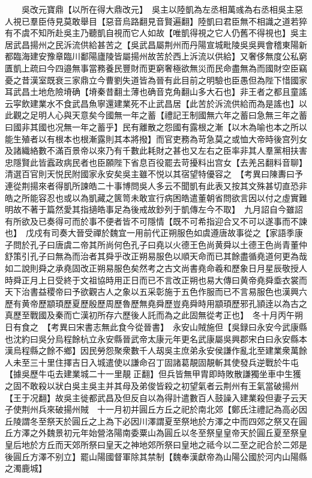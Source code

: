 　　吳改元寶鼎【以所在得大鼎改元】　吳主以陸凱為左丞相萬彧為右丞相吳主惡人視已羣臣侍見莫敢舉目【惡音烏路翻見音賢遍翻】陸凱曰君臣無不相識之道若猝有不虞不知所赴吳主乃聽凱自視而它人如故【唯凱得視之它人仍舊不得視也】吳主居武昌揚州之民泝流供給甚苦之【吳武昌屬荆州而丹陽宣城毗陵吳吳興會稽東陽新都臨海建安豫章臨川鄱陽廬陵皆屬揚州故苦於西上泝流以供給】又奢侈無度公私窮匱凱上疏曰今四邉無事當務養民豐財而更窮奢極欲無災而民命盡無為而國財空臣竊憂之昔漢室既衰三家鼎立今曹劉失道皆為晉有此目前之明驗也臣愚但為陛下惜國家耳武昌土地危險塉确【塉秦昔翻土薄也确音克角翻山多大石也】非王者之都且童謠云寜飲建業水不食武昌魚寧還建業死不止武昌居【此苦於泝流供給而為是謠也】以此觀之足明人心與天意矣今國無一年之蓄【禮記王制國無六年之蓄曰急無三年之蓄曰國非其國也况無一年之蓄乎】民有離散之怨國有露根之漸【以木為喻也本之所以能生殖者以有根本也根漸露則其本將撥】而官吏務為苛急莫之或恤大帝時後宫列女及諸織絡數不滿百景帝以來乃有千數此耗財之甚也又左右之臣率非其人羣黨相扶害忠隱賢此皆蠧政病民者也臣願陛下省息百役罷去苛擾料出宫女【去羌呂翻料音聊】清選百官則天悦民附國家永安矣吳主雖不悦以其宿望特優容之　【考異曰陳夀曰予連從荆揚來者得凱所諫皓二十事博問吳人多云不聞凱有此表又按其文殊甚切直恐非皓之所能容忍也或以為凱藏之篋笥未敢宣行病困皓遣董朝省問欲言因以付之虛實難明故不著于篇然愛其指擿皓事足為後戒故鈔列于凱傳左今不取】　九月詔自今雖詔有所欲及已奏得可而於事不便者皆不可隱情【既不可希指迎合又不可以遂事而不諫也】　戊戍有司奏大晉受禪於魏宜一用前代正朔服色如虞遵唐故事從之【家語季康子問於孔子曰唐虞二帝其所尚何色孔子曰堯以火德王色尚黄舜以土德王色尚青董仲舒策引孔子曰無為而治者其舜乎改正朔易服色以順天命而已其餘盡循堯道何更為哉如二說則舜之承堯固改正朔易服色矣然考之古文尚書堯命羲和歷象日月星辰敬授人時舜正月上日受終于文祖協時用正日而已不言改正朔也易大傳曰黄帝堯舜埀衣裳而天下治書益稷帝曰予欲觀古人之象以五采彰施于五色作服而已不言易服色也漢興六歷有黄帝歷顓頊歷夏歷殷歷周歷魯歷無堯舜歷豈堯舜時用顓頊歷邪孔頴逹以為古之真歷至戰國及秦而亡漢初所存六歷後人託而為之此固無從考正也】　冬十月丙午朔日有食之　【考異曰宋書志無此食今從晉書】　永安山賊施但【吳録曰永安今武康縣也沈約曰吳分烏程餘杭立永安縣晉武帝太康元年更名武康屬吳興郡宋白曰永安縣本漢烏程縣之餘不鄉】因民勞怨聚衆數千人刼吳主庶弟永安侯謙作亂北至建業衆萬餘人未至三十里住擇吉日入城遣使以謙命召丁固諸葛靚固靚斬其使發兵逆戰於牛屯【據吳歷牛屯去建業城二十一里靚正翻】但兵皆無甲胄即時敗散謙獨坐車中生獲之固不敢殺以狀白吳主吳主并其母及弟俊皆殺之初望氣者云荆州有王氣當破揚州【王于况翻】故吳主徙都武昌及但反自以為得計遣數百人鼓譟入建業殺但妻子云天子使荆州兵來破揚州賊　十一月初并圓丘方丘之祀於南北郊【鄭氏注禮記為高必因丘陵謂冬至祭天於圓丘之上為下必因川澤謂夏至祭地於方澤之中而四郊之祭又在圓丘方澤之外魏景初元年始營洛陽南委粟山為圓丘以冬至祭皇皇帝天於圓丘夏至祭皇皇后地於方丘而天郊所祭曰皇天之神地郊所祭曰皇地之祗今以二至之祀合於二郊是後圓丘方澤不别立】罷山陽國督軍除其禁制【魏奉漢獻帝為山陽公國於河内山陽縣之濁鹿城】

